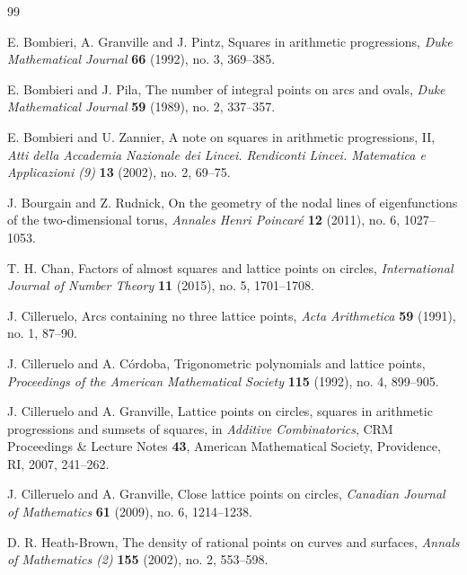 \documentclass[11pt]{article}
\begin{document}
\begin{thebibliography}{99}

E. Bombieri, A. Granville and J. Pintz,
\newblock Squares in arithmetic progressions,
\newblock \emph{Duke Mathematical Journal} \textbf{66} (1992), no. 3, 369--385.

E. Bombieri and J. Pila,
\newblock The number of integral points on arcs and ovals,
\newblock \emph{Duke Mathematical Journal} \textbf{59} (1989), no. 2, 337--357.

E. Bombieri and U. Zannier,
\newblock A note on squares in arithmetic progressions, II,
\newblock \emph{Atti della Accademia Nazionale dei Lincei. Rendiconti Lincei.
Matematica e Applicazioni (9)} \textbf{13} (2002), no. 2, 69--75.

J. Bourgain and Z. Rudnick,
\newblock On the geometry of the nodal lines of eigenfunctions of the
two-dimensional torus,
\newblock \emph{Annales Henri Poincar\'e} \textbf{12} (2011), no. 6,
1027--1053.

T. H. Chan,
\newblock Factors of almost squares and lattice points on circles,
\newblock \emph{International Journal of Number Theory} \textbf{11} (2015),
no. 5, 1701--1708.

J. Cilleruelo,
\newblock Arcs containing no three lattice points,
\newblock \emph{Acta Arithmetica} \textbf{59} (1991), no. 1, 87--90.

J. Cilleruelo and A. C\'ordoba,
\newblock Trigonometric polynomials and lattice points,
\newblock \emph{Proceedings of the American Mathematical Society}
\textbf{115} (1992), no. 4, 899--905.

J. Cilleruelo and A. Granville,
\newblock Lattice points on circles, squares in arithmetic progressions and
sumsets of squares,
\newblock in \emph{Additive Combinatorics}, CRM Proceedings \& Lecture Notes
\textbf{43}, American Mathematical Society, Providence, RI, 2007, 241--262.

J. Cilleruelo and A. Granville,
\newblock Close lattice points on circles,
\newblock \emph{Canadian Journal of Mathematics} \textbf{61} (2009), no. 6,
1214--1238.

D. R. Heath-Brown,
\newblock The density of rational points on curves and surfaces,
\newblock \emph{Annals of Mathematics (2)} \textbf{155} (2002), no. 2,
553--598.


\end{thebibliography}
\end{document}
